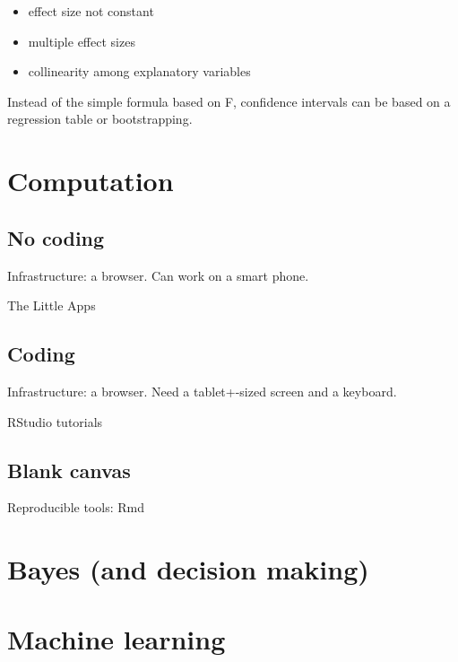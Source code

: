 \documentclass[]{book}
\providecommand{\tightlist}{%
  \setlength{\itemsep}{0pt}\setlength{\parskip}{0pt}}
\begin{document}
\begin{itemize}
\tightlist
\item
  effect size not constant
\item
  multiple effect sizes
\item
  collinearity among explanatory variables
\end{itemize}

Instead of the simple formula based on F, confidence intervals can be based on a regression table or bootstrapping.

\hypertarget{computation}{%
\chapter{Computation}\label{computation}}

\hypertarget{no-coding}{%
\section{No coding}\label{no-coding}}

Infrastructure: a browser. Can work on a smart phone.

The Little Apps

\hypertarget{coding}{%
\section{Coding}\label{coding}}

Infrastructure: a browser. Need a tablet+-sized screen and a keyboard.

RStudio tutorials

\hypertarget{blank-canvas}{%
\section{Blank canvas}\label{blank-canvas}}

Reproducible tools: Rmd

\hypertarget{bayes-and-decision-making}{%
\chapter{Bayes (and decision making)}\label{bayes-and-decision-making}}

\hypertarget{machine-learning}{%
\chapter{Machine learning}\label{machine-learning}}
\end{document}

